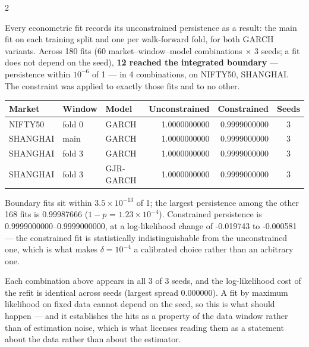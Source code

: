 \documentclass[10pt]{article}
\newcommand{\navybox}[2]{\begin{tcolorbox}[mybox={Navy}{LBg},title={#1}]#2\end{tcolorbox}}
\newcommand{\skybox}[2]{\begin{tcolorbox}[mybox={Sky}{BBg},title={#1}]#2\end{tcolorbox}}
\begin{document}
\begin{multicols}{2}

\navybox{Boundary Fits, Counted (Table~8)}{%
Every econometric fit records its unconstrained persistence as a result: the main fit on each training split and one per walk-forward fold, for both GARCH variants. Across 180 fits (60 market--window--model combinations $\times$ 3 seeds; a fit does not depend on the seed), \textbf{12 reached the integrated boundary} --- persistence within $10^{-6}$ of 1 --- in 4 combinations, on NIFTY50, SHANGHAI. The constraint was applied to exactly those fits and to no other.

\smallskip
{\footnotesize
\begin{tabular}{@{}lllrrc@{}}
\toprule
Market & Window & Model & Unconstrained & Constrained & Seeds \\
\midrule
NIFTY50 & fold 0 & GARCH & 1.0000000000 & 0.9999000000 & 3 \\
SHANGHAI & main & GARCH & 1.0000000000 & 0.9999000000 & 3 \\
SHANGHAI & fold 3 & GARCH & 1.0000000000 & 0.9999000000 & 3 \\
SHANGHAI & fold 3 & GJR-GARCH & 1.0000000000 & 0.9999000000 & 3 \\
\bottomrule
\end{tabular}}

\smallskip
Boundary fits sit within $3.5\times10^{-13}$ of 1; the largest persistence among the other 168 fits is 0.99987666 ($1-p$ = $1.23\times10^{-4}$). Constrained persistence is 0.9999000000--0.9999000000, at a log-likelihood change of -0.019743 to -0.000581 --- the constrained fit is statistically indistinguishable from the unconstrained one, which is what makes $\delta=10^{-4}$ a calibrated choice rather than an arbitrary one.}

\skybox{The Hits Are Seed-Invariant}{%
Each combination above appears in all 3 of 3 seeds, and the log-likelihood cost of the refit is identical across seeds (largest spread 0.000000). A fit by maximum likelihood on fixed data cannot depend on the seed, so this is what should happen --- and it establishes the hits as a property of the data window rather than of estimation noise, which is what licenses reading them as a statement about the data rather than about the estimator.}


\end{multicols}
\end{document}
